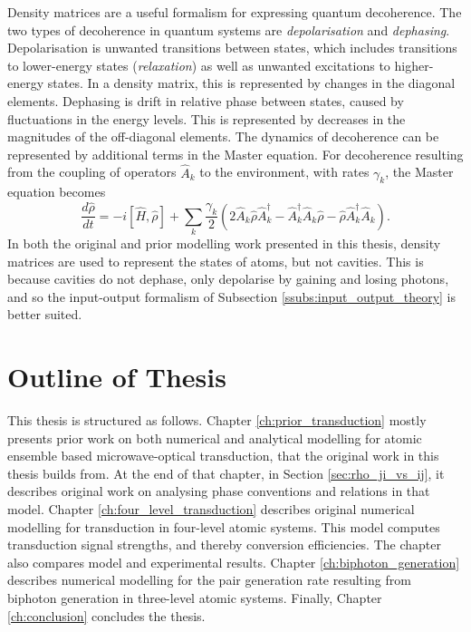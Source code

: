Density matrices are a useful formalism for expressing quantum decoherence. The two types of decoherence in quantum systems are \textit{depolarisation} and \textit{dephasing}. Depolarisation is unwanted transitions between states, which includes transitions to lower-energy states (\textit{relaxation}) as well as unwanted excitations to higher-energy states. In a density matrix, this is represented by changes in the diagonal elements. Dephasing is drift in relative phase between states, caused by fluctuations in the energy levels. This is represented by decreases in the magnitudes of the off-diagonal elements. The dynamics of decoherence can be represented by additional terms in the Master equation. For decoherence resulting from the coupling of operators $\hat{A}_k$ to the environment, with rates $\gamma_k$, the Master equation becomes
\begin{equation}
    \frac{d\hat{\rho}}{dt} = -i[\hat{H}, \hat{\rho}] + \sum_k \frac{\gamma_k}{2}\left(2\hat{A}_k\hat{\rho}\hat{A}_k^\dagger - \hat{A}_k^\dagger\hat{A}_k\hat{\rho} - \hat{\rho}\hat{A}_k^\dagger\hat{A}_k\right).
\end{equation}
In both the original and prior modelling work presented in this thesis, density matrices are used to represent the states of atoms, but not cavities. This is because cavities do not dephase, only depolarise by gaining and losing photons, and so the input-output formalism of Subsection \ref{ssubs:input_output_theory} is better suited.

\section{Outline of Thesis}
This thesis is structured as follows. Chapter \ref{ch:prior_transduction} mostly presents prior work on both numerical and analytical modelling for atomic ensemble based microwave-optical transduction, that the original work in this thesis builds from. At the end of that chapter, in Section \ref{sec:rho_ji_vs_ij}, it describes original work on analysing phase conventions and relations in that model. Chapter \ref{ch:four_level_transduction} describes original numerical modelling for transduction in four-level atomic systems. This model computes transduction signal strengths, and thereby conversion efficiencies. The chapter also compares model and experimental results. Chapter \ref{ch:biphoton_generation} describes numerical modelling for the pair generation rate resulting from biphoton generation in three-level atomic systems. Finally, Chapter \ref{ch:conclusion} concludes the thesis.
